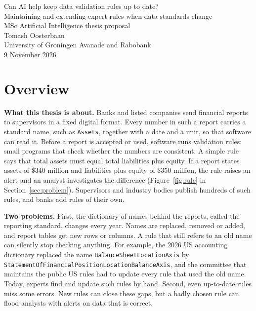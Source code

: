 \documentclass[11pt,a4paper]{article}
\newcommand{\ab}{\allowbreak}
\let\oldsection\section
\renewcommand{\section}{\FloatBarrier\oldsection}
\begin{document}
\begin{center}
{\Large Can AI help keep data validation rules up to date?}\\[0.3em]
{\large Maintaining and extending expert rules when data standards change}\\[0.5em]
MSc Artificial Intelligence thesis proposal\\[0.8em]
Tomash Oosterbaan\\
University of Groningen \textbar{} Avanade and Rabobank\\[0.5em]
9 November 2026
\end{center}

\section*{Overview}

\textbf{What this thesis is about.} Banks and listed companies send financial reports to supervisors in a fixed digital format. Every number in such a report carries a standard name, such as \texttt{Assets}, together with a date and a unit, so that software can read it. Before a report is accepted or used, software runs validation rules: small programs that check whether the numbers are consistent. A simple rule says that total assets must equal total liabilities plus equity. If a report states assets of \$340 million and liabilities plus equity of \$350 million, the rule raises an alert and an analyst investigates the difference (Figure~\ref{fig:rule} in Section~\ref{sec:problem}). Supervisors and industry bodies publish hundreds of such rules, and banks add rules of their own.

\textbf{Two problems.} First, the dictionary of names behind the reports, called the reporting standard, changes every year. Names are replaced, removed or added, and report tables get new rows or columns. A rule that still refers to an old name can silently stop checking anything. For example, the 2026 US accounting dictionary replaced the name \texttt{BalanceSheetLocationAxis} by \texttt{StatementOfFinancialPosition\ab LocationBalanceAxis}, and the committee that maintains the public US rules had to update every rule that used the old name. Today, experts find and update such rules by hand. Second, even up-to-date rules miss some errors. New rules can close these gaps, but a badly chosen rule can flood analysts with alerts on data that is correct.
\end{document}

